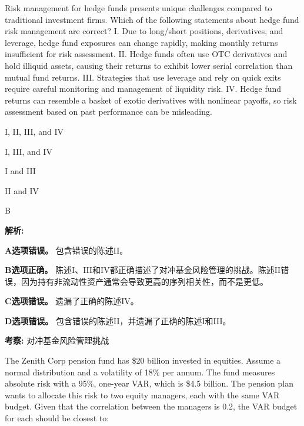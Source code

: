 \documentclass{article}
\newcounter{question} %
\newenvironment{explanation}
{\textbf{解析:}\par}
{\par}
\newcommand{\checklist}[1]{
    \textbf{考察:} #1 \par %
    \addcontentsline{toc}{subsection}{题号\thequestion 考察: #1} %
    \vspace{2em} %
}
\begin{document}
\begin{question}
    Risk management for hedge funds presents unique challenges compared to traditional investment firms. Which of the following statements about hedge fund risk management are correct?  
    I. Due to long/short positions, derivatives, and leverage, hedge fund exposures can change rapidly, making monthly returns insufficient for risk assessment.  
    II. Hedge funds often use OTC derivatives and hold illiquid assets, causing their returns to exhibit lower serial correlation than mutual fund returns.  
    III. Strategies that use leverage and rely on quick exits require careful monitoring and management of liquidity risk.  
    IV. Hedge fund returns can resemble a basket of exotic derivatives with nonlinear payoffs, so risk assessment based on past performance can be misleading.
\end{question}

\begin{choices}
    \item I, II, III, and IV
    \item I, III, and IV
    \item I and III
    \item II and IV
\end{choices}

\begin{correctanswer}
    B
\end{correctanswer}

\begin{explanation}
    \textbf{A选项错误。}  
    包含错误的陈述II。

    \textbf{B选项正确。}  
    陈述I、III和IV都正确描述了对冲基金风险管理的挑战。陈述II错误，因为持有非流动性资产通常会导致更高的序列相关性，而不是更低。

    \textbf{C选项错误。}  
    遗漏了正确的陈述IV。

    \textbf{D选项错误。}  
    包含错误的陈述II，并遗漏了正确的陈述I和III。
\end{explanation}
\checklist{对冲基金风险管理挑战}



\begin{question}
    The Zenith Corp pension fund has \$20 billion invested in equities. Assume a normal distribution and a volatility of 18\% per annum. The fund measures absolute risk with a 95\%, one-year VAR, which is \$4.5 billion. The pension plan wants to allocate this risk to two equity managers, each with the same VAR budget. Given that the correlation between the managers is 0.2, the VAR budget for each should be closest to:
\end{question}
\end{document}
